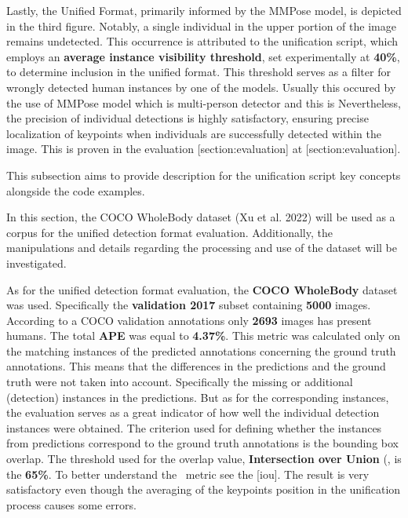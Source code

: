 Lastly, the Unified Format, primarily informed by the MMPose model, is depicted in the third figure. Notably, a single individual in the upper portion of the image remains undetected. This occurrence is attributed to the unification script, which employs an {\bf average instance visibility threshold}, set experimentally at {\bf 40\%}, to determine inclusion in the unified format. This threshold serves as a filter for wrongly detected human instances by one of the models. Usually this occured by the use of MMPose model which is multi-person detector and this is Nevertheless, the precision of individual detections is highly satisfactory, ensuring precise localization of keypoints when individuals are successfully detected within the image. This is proven in the evaluation [section:evaluation] at [section:evaluation].

This subsection aims to provide description for the unification script key concepts alongside the code examples.

In this section, the COCO WholeBody dataset (Xu et al. 2022) will be used as a corpus for the unified detection format evaluation. Additionally, the manipulations and details regarding the processing and use of the dataset will be investigated.

As for the unified detection format evaluation, the {\bf COCO WholeBody} dataset was used. Specifically the {\bf validation 2017} subset containing {\bf 5000} images. According to a COCO validation annotations only {\bf 2693} images has present humans. The total {\bf APE} was equal to {\bf 4.37\%}. This metric was calculated only on the matching instances of the predicted annotations concerning the ground truth annotations. This means that the differences in the predictions and the ground truth were not taken into account. Specifically the missing or additional (detection) instances in the predictions. But as for the corresponding instances, the evaluation serves as a great indicator of how well the individual detection instances were obtained. The criterion used for defining whether the instances from predictions correspond to the ground truth annotations is the bounding box overlap. The threshold used for the overlap value, {\bf Intersection over Union} (\IoU\), is the {\bf 65\%}. To better understand the \IoU\ metric see the [iou]. The result is very satisfactory even though the averaging of the keypoints position in the unification process causes some errors.

